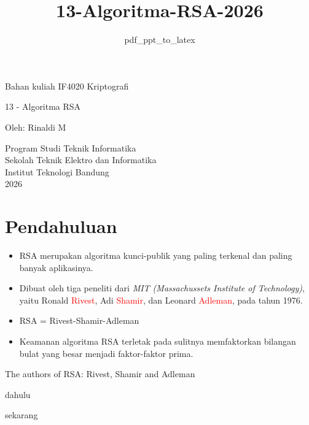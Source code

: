\documentclass{article}
\title{13-Algoritma-RSA-2026}
\author{pdf\_ppt\_to\_latex}
\date{}
\begin{document}

\begin{center}
Bahan kuliah IF4020 Kriptografi

{\huge \color{red} 13 - Algoritma RSA}

\vspace{20mm}

Oleh: Rinaldi M

\vspace{10mm}

Program Studi Teknik Informatika\\
Sekolah Teknik Elektro dan Informatika\\
Institut Teknologi Bandung\\
2026
\end{center}

\newpage


\section*{Pendahuluan}

\begin{itemize}
    \item RSA merupakan algoritma kunci-publik yang paling terkenal dan paling banyak aplikasinya.
    \item Dibuat oleh tiga peneliti dari \textit{MIT (Massachussets Institute of Technology)}, yaitu Ronald \textcolor{red}{Rivest}, Adi \textcolor{red}{Shamir}, dan Leonard \textcolor{red}{Adleman}, pada tahun 1976.
    \item RSA = Rivest-Shamir-Adleman
    \item Keamanan algoritma RSA terletak pada sulitnya memfaktorkan bilangan bulat yang besar menjadi faktor-faktor prima.
\end{itemize}

\newpage


\vspace{132.46mm}

The authors of RSA: Rivest, Shamir and Adleman

\vspace{10mm}

dahulu

\vspace{10mm}

sekarang
\end{document}
